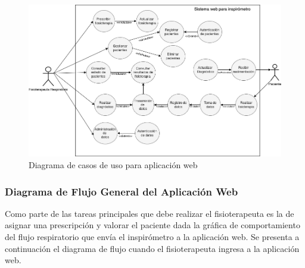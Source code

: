\documentclass[12pt]{article}
\begin{document}
\begin{figure}[ht]
\centering
\includegraphics[scale=0.45]{imag/casosdeusof.png}
\caption{Diagrama de casos de uso para aplicación web }
\label{5}
\end{figure}
\FloatBarrier


\subsubsection{Diagrama de Flujo General del Aplicación Web} %

Como parte de las tareas principales que debe realizar el fisioterapeuta es la de asignar una prescripción y valorar el paciente dada la gráfica de comportamiento del flujo respiratorio que envía el inspirómetro a la aplicación web. Se presenta a continuación el diagrama de flujo cuando el fisioterapeuta ingresa a la aplicación web. 
\end{document}
